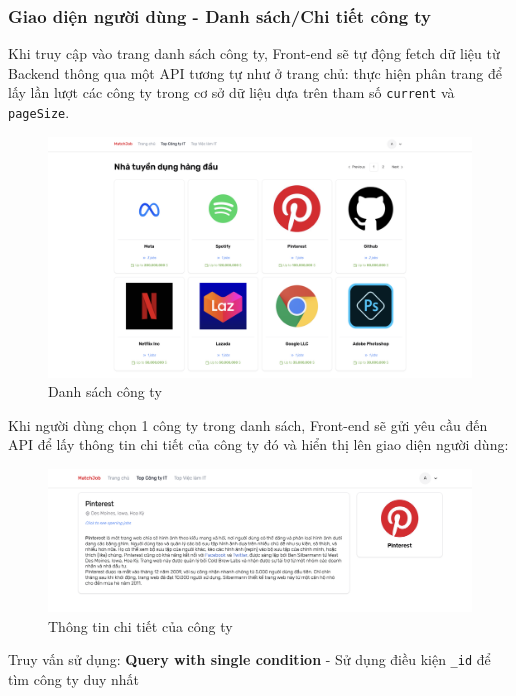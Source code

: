 \subsubsection{Giao diện người dùng - Danh sách/Chi tiết công ty}

Khi truy cập vào trang danh sách công ty, Front-end sẽ tự động fetch dữ liệu từ Backend thông qua một API tương tự như ở trang chủ: thực hiện phân trang để lấy lần lượt các công ty trong cơ sở dữ liệu dựa trên tham số \texttt{current} và \texttt{pageSize}.

\begin{figure}[H]
    \centering
    \includegraphics[width=\linewidth]{DBMS-Application/Images/list-company.png}
    \caption{Danh sách công ty}
    \label{fig:enter-label}
\end{figure}

Khi người dùng chọn 1 công ty trong danh sách, Front-end sẽ gửi yêu cầu đến API để lấy thông tin chi tiết của công ty đó và hiển thị lên giao diện người dùng:

\begin{figure}[H]
    \centering
    \includegraphics[width=\linewidth]{DBMS-Application/Images/company-detail.png}
    \caption{Thông tin chi tiết của công ty}
    \label{fig:enter-label}
\end{figure}

Truy vấn sử dụng: \textbf{Query with single condition} - Sử dụng điều kiện \texttt{\_id} để tìm công ty duy nhất

